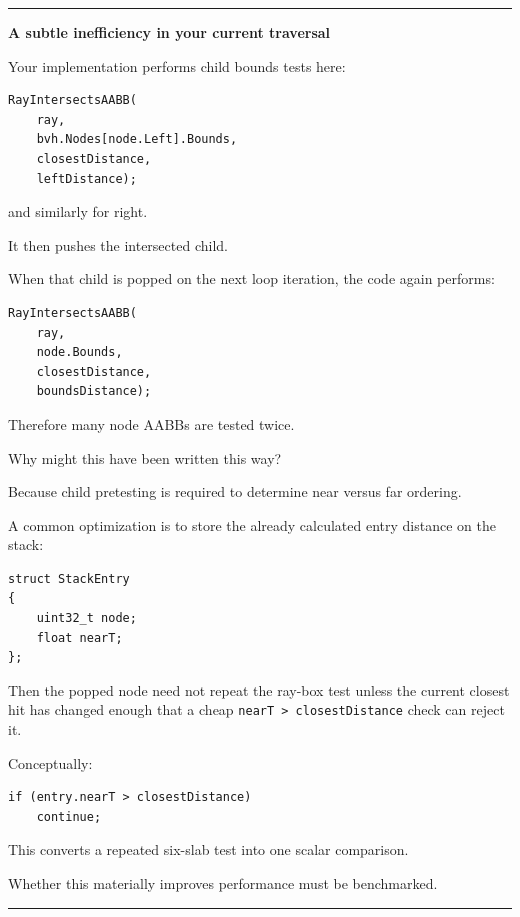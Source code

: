 \begin{center}\rule{0.5\linewidth}{0.5pt}\end{center}

\textbf{A subtle inefficiency in your current traversal}

Your implementation performs child bounds tests here:

\begin{verbatim}
RayIntersectsAABB(
    ray,
    bvh.Nodes[node.Left].Bounds,
    closestDistance,
    leftDistance);
\end{verbatim}

and similarly for right.

It then pushes the intersected child.

When that child is popped on the next loop iteration, the code again performs:

\begin{verbatim}
RayIntersectsAABB(
    ray,
    node.Bounds,
    closestDistance,
    boundsDistance);
\end{verbatim}

Therefore many node AABBs are tested twice.

Why might this have been written this way?

Because child pretesting is required to determine near versus far ordering.

A common optimization is to store the already calculated entry distance on the stack:

\begin{verbatim}
struct StackEntry
{
    uint32_t node;
    float nearT;
};
\end{verbatim}

Then the popped node need not repeat the ray-box test unless the current closest hit has changed enough that a cheap \texttt{nearT\ \textgreater{}\ closestDistance} check can reject it.

Conceptually:

\begin{verbatim}
if (entry.nearT > closestDistance)
    continue;
\end{verbatim}

This converts a repeated six-slab test into one scalar comparison.

Whether this materially improves performance must be benchmarked.

\begin{center}\rule{0.5\linewidth}{0.5pt}\end{center}

